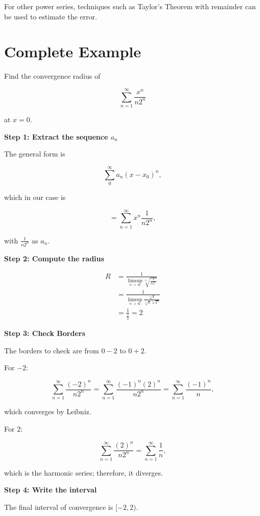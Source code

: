 For other power series, techniques such as Taylor's Theorem with remainder can be used to estimate the error.

\section{Complete Example}

Find the convergence radius of 

\[
    \sum_{n = 1}^{\infty} \frac{x^n}{n2^n} 
\]

at \(x = 0\).

\textbf{Step 1: Extract the sequence \(a_n\)}

The general form is 

\[
    \sum_{0}^{\infty} a_n (x - x_0)^n,
\]

which in our case is

\[
    = \sum_{n = 1}^{\infty} x^n \frac{1}{n2^n},
\]

with \(\frac{1}{n2^n}\) as \(a_n\).

\textbf{Step 2: Compute the radius}

\begin{align*}
     R &= \frac{1}{\limsup_{n \to \infty} \sqrt[n]{\frac{1}{n2^n}}} \\
      &= \frac{1}{\limsup_{n \to \infty}\frac{\sqrt[n]{1}}{\sqrt[n]{n} \sqrt[n]{2^n}}} \\
      &= \frac{1}{\frac{1}{2}} = 2
\end{align*}

\textbf{Step 3: Check Borders}

The borders to check are from \( 0 - 2 \) to \( 0 + 2 \).

For \(-2\):

\[
    \sum_{n = 1}^{\infty} \frac{(-2)^n}{n2^n} = \sum_{n = 1}^{\infty} \frac{(-1)^n (2)^n}{n2^n} 
    = \sum_{n = 1}^{\infty} \frac{(-1)^n}{n},
\]

which converges by Leibniz.

For \(2\):

\[
    \sum_{n = 1}^{\infty} \frac{(2)^n}{n2^n} = \sum_{n = 1}^{\infty} \frac{1}{n},
\]

which is the harmonic series; therefore, it diverges.

\textbf{Step 4: Write the interval}

The final interval of convergence is \([-2, 2)\).











